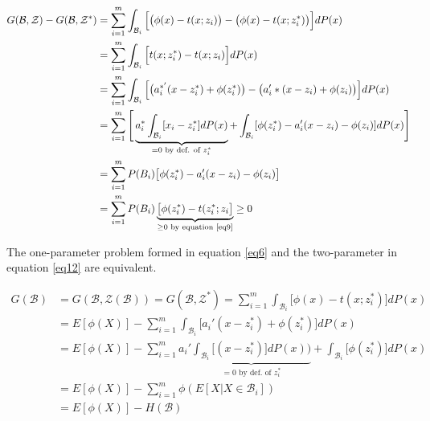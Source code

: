 \documentclass{article}
\begin{document}
\begin{tcolorbox}[coltitle= black!80, colframe=blue!35, colback=blue!10 ,title=\textbf{Proof of Theorem}]

 \begin{align}
 	G(\mathcal B , \mathcal Z) - G(\mathcal B, \mathcal Z^*) & = \sum_{i=1}^{m}\int_{\mathcal B_i}\Big[  \big( \phi(x) - t(x; z_i) \big) - \big( \phi(x) - t(x; z_i^*) \big)   \Big]dP(x) \\
 	& = \sum_{i=1}^{m}\int_{\mathcal B_i} \Big[ t(x; z_i^*) - t(x; z_i) \Big]dP(x)\\
 	& = \sum_{i=1}^{m}\int_{\mathcal B_i} \Big[ \big( a_i^{*'} (x - z_i^*) + \phi(z_i^*)  \big) -  \big( a_i'*(x-z_i) + \phi(z_i) \big)  \Big]dP(x)\\ 	
 	& = \sum_{i=1}^{m} \Bigg[ \underbrace{a_i^* \int_{\mathcal B_i} [x_i - z_i^*]dP(x)}_{=0 \text{ by def. of }z_i^*} + \int_{\mathcal B_i}[\phi(z_i^*) - a_i'(x-z_i) - \phi(z_i)]dP(x) \Bigg]\\
 	& = \sum_{i=1}^{m} P(B_i)\big[ \phi(z_i^*) - a_i'(x - z_i) - \phi(z_i) \big]\\
 	& = \sum_{i=1}^{m} P(B_i) \underbrace{\big[ \phi(z_i^*) - t(z_i^*;z_i \big]}_{\ge 0 \text{ by equation \ref{eq9}}} \ge 0
 \end{align}
 
\end{tcolorbox}

\begin{tcolorbox}[coltitle= black!80, colframe=red!35, colback=red!10 ,title=\textbf{Corollary: The One-parameter Maximization Problem Alternative} ]

The one-parameter problem formed in equation \ref{eq6} and the two-parameter in equation \ref{eq12} are equivalent.

\end{tcolorbox}


\begin{tcolorbox}[coltitle= black!80, colframe=blue!35, colback=blue!10 ,title=\textbf{Proof of Corollary}]

\begin{align}
	 G(\mathcal B) &= G(\mathcal B, \mathcal Z(\mathcal B)) = G(\mathcal B, \mathcal Z^*) = \sum_{i=1}^m \int_{\mathcal B_i} \big[ \phi(x) - t(x; z_i^*) \big]dP(x) \\
	 & = E[\phi(X)] - \sum_{i=1}^m \int_{\mathcal B_i}\big[ a_i'(x-z_i^*) + \phi(z_i^*) \big]dP(x) \\
	 & = E[\phi(X)] - \sum_{i=1}^m a_i'\underbrace{\int_{\mathcal B_i}\big[ (x-z_i^*)]dP(x))}_{= 0 \text{ by def. of }z_i^*} + \int_{\mathcal B_i} \big[ \phi(z_i^*) \big]dP(x) \\
	 & = E[\phi(X)] - \sum_{i=1}^m \phi(E[X|X\in\mathcal B_i]) \\
	 & = E[\phi(X)] - H(\mathcal B)
\end{align}

\end{tcolorbox}
\end{document}
